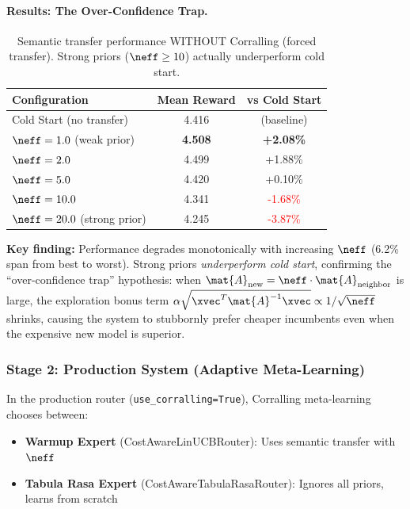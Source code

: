 \paragraph{Results: The Over-Confidence Trap.}
\begin{table}[h]
\centering
\small
\begin{tabular}{lcc}
\toprule
\textbf{Configuration} & \textbf{Mean Reward} & \textbf{vs Cold Start} \\
\midrule
Cold Start (no transfer) & 4.416 & (baseline) \\
\midrule
$\neff = 1.0$ (weak prior) & \textbf{4.508} & \textbf{+2.08\%} \\
$\neff = 2.0$ & 4.499 & +1.88\% \\
$\neff = 5.0$ & 4.420 & +0.10\% \\
$\neff = 10.0$ & 4.341 & \textcolor{red}{-1.68\%} \\
$\neff = 20.0$ (strong prior) & 4.245 & \textcolor{red}{-3.87\%} \\
\bottomrule
\end{tabular}
\caption{Semantic transfer performance WITHOUT Corralling (forced transfer). Strong priors ($\neff \geq 10$) actually underperform cold start.}
\label{tab:ablation_no_corralling}
\end{table}

\textbf{Key finding:} Performance degrades monotonically with increasing $\neff$ (6.2\% span from best to worst). Strong priors \textit{underperform cold start}, confirming the ``over-confidence trap'' hypothesis: when $\mat{A}_{\text{new}} = \neff \cdot \mat{A}_{\text{neighbor}}$ is large, the exploration bonus term $\alpha \sqrt{\xvec^T \mat{A}^{-1} \xvec} \propto 1/\sqrt{\neff}$ shrinks, causing the system to stubbornly prefer cheaper incumbents even when the expensive new model is superior.


\subsubsection{Stage 2: Production System (Adaptive Meta-Learning)}

In the production router (\texttt{use\_corralling=True}), Corralling meta-learning chooses between:
\begin{itemize}[leftmargin=*, itemsep=2pt]
    \item \textbf{Warmup Expert} (CostAwareLinUCBRouter): Uses semantic transfer with $\neff$
    \item \textbf{Tabula Rasa Expert} (CostAwareTabulaRasaRouter): Ignores all priors, learns from scratch
\end{itemize}

